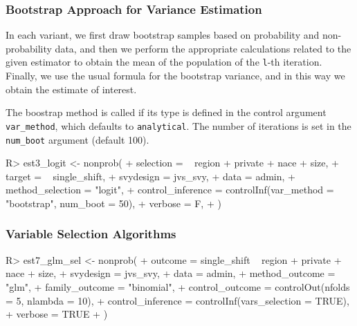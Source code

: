 \documentclass[
]{jss}
\begin{document}
\subsubsection{Bootstrap Approach for Variance
Estimation}\label{bootstrap-approach-for-variance-estimation}

In each variant, we first draw bootstrap samples based on probability
and non-probability data, and then we perform the appropriate
calculations related to the given estimator to obtain the mean of the
population of the \texttt{l}-th iteration. Finally, we use the usual
formula for the bootstrap variance, and in this way we obtain the
estimate of interest.

The boostrap method is called if its type is defined in the control
argument \texttt{var\_method}, which defaults to \texttt{analytical}.
The number of iterations is set in the \texttt{num\_boot} argument
(default 100).

\begin{CodeChunk}
\begin{CodeInput}
R> est3_logit <- nonprob(
+   selection = ~ region + private + nace + size,
+   target = ~ single_shift,
+   svydesign = jvs_svy,
+   data = admin,
+   method_selection = "logit",
+   control_inference = controlInf(var_method = "bootstrap", num_boot = 50),
+   verbose = F,
+ )
\end{CodeInput}
\end{CodeChunk}

\subsubsection{Variable Selection
Algorithms}\label{variable-selection-algorithms}

\begin{CodeChunk}
\begin{CodeInput}
R> est7_glm_sel <- nonprob(
+   outcome = single_shift ~ region + private + nace + size,
+   svydesign = jvs_svy,
+   data = admin,
+   method_outcome = "glm",
+   family_outcome = "binomial",
+   control_outcome = controlOut(nfolds = 5, nlambda = 10),
+   control_inference = controlInf(vars_selection = TRUE),
+   verbose = TRUE
+ )
\end{CodeInput}
\end{CodeChunk}
\end{document}
